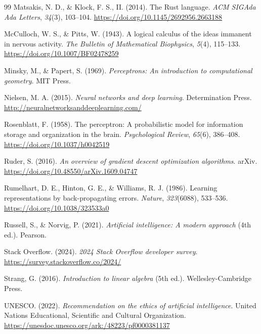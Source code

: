 \begin{thebibliography}{99}
Matsakis, N. D., \& Klock, F. S., II. (2014). The Rust language. \emph{ACM SIGAda Ada Letters}, \emph{34}(3), 103–104. \url{https://doi.org/10.1145/2692956.2663188}

McCulloch, W. S., \& Pitts, W. (1943). A logical calculus of the ideas immanent in nervous activity. \emph{The Bulletin of Mathematical Biophysics}, \emph{5}(4), 115–133. \url{https://doi.org/10.1007/BF02478259}

Minsky, M., \& Papert, S. (1969). \emph{Perceptrons: An introduction to computational geometry}. MIT Press.

Nielsen, M. A. (2015). \emph{Neural networks and deep learning}. Determination Press. \url{http://neuralnetworksanddeeplearning.com/}

Rosenblatt, F. (1958). The perceptron: A probabilistic model for information storage and organization in the brain. \emph{Psychological Review}, \emph{65}(6), 386–408. \url{https://doi.org/10.1037/h0042519}

Ruder, S. (2016). \emph{An overview of gradient descent optimization algorithms}. arXiv. \url{https://doi.org/10.48550/arXiv.1609.04747}

Rumelhart, D. E., Hinton, G. E., \& Williams, R. J. (1986). Learning representations by back-propagating errors. \emph{Nature}, \emph{323}(6088), 533–536. \url{https://doi.org/10.1038/323533a0}

Russell, S., \& Norvig, P. (2021). \emph{Artificial intelligence: A modern approach} (4th ed.). Pearson.

Stack Overflow. (2024). \emph{2024 Stack Overflow developer survey}. \url{https://survey.stackoverflow.co/2024/}

Strang, G. (2016). \emph{Introduction to linear algebra} (5th ed.). Wellesley-Cambridge Press.

UNESCO. (2022). \emph{Recommendation on the ethics of artificial intelligence}. United Nations Educational, Scientific and Cultural Organization. \url{https://unesdoc.unesco.org/ark:/48223/pf0000381137}

\end{thebibliography}
